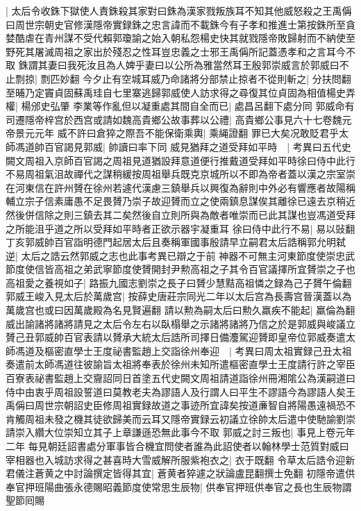 |{
	太后令收銖下獄使人責銖殺其家對曰銖為漢家戮叛族耳不知其他威怒殺之王禹偁曰周世宗朝史官修漢隱帝實録銖之忠言諱而不載銖今有子孝和推進士第按銖所至貪婪酷虐在青州謀不受代賴郭瓊諭之始入朝私怨楊史快其就戮隱帝敗歸射而不納使至野死其屠滅周祖之家出於殘忍之性耳豈忠義之士邪王禹偁所記蓋憑孝和之言耳今不取}
銖謂其妻曰我死汝且為人婢乎妻曰以公所為雅當然耳王殷郭崇威言於郭威曰不止剽掠|{
	剽匹妙翻}
今夕止有空城耳威乃命諸將分部禁止掠者不從則斬之|{
	分扶問翻}
至晡乃定竇貞固蘇禹珪自七里寨逃歸郭威使人訪求得之尋復其位貞固為相值楊史弄權|{
	楊邠史弘肇}
李業等作亂但以凝重處其間自全而已|{
	處昌呂翻下處分同}
郭威命有司遷隱帝梓宫於西宫或請如魏高貴鄉公故事葬以公禮|{
	高貴鄉公事見六十七卷魏元帝景元元年}
威不許曰倉猝之際吾不能保衛乘輿|{
	乘䋲證翻}
罪已大矣况敢貶君乎太師馮道帥百官謁見郭威|{
	帥讀曰率下同}
威見猶拜之道受拜如平時　|{
	考異曰五代史闕文周祖入京師百官謁之周祖見道猶設拜意道便行推戴道受拜如平時徐曰侍中此行不易周祖氣沮故禪代之謀稍緩按周祖舉兵既克京城所以不即為帝者蓋以漢之宗室崇在河東信在許州贇在徐州若遽代漢慮三鎮舉兵以興復為辭則中外必有響應者故陽稱輔立宗子信素庸愚不足畏贇乃崇子故迎贇而立之使兩鎮息謀俟其離徐已遠去京稍近然後併信除之則三鎮去其二矣然後自立則所與為敵者唯崇而已此其謀也豈馮道受拜之所能沮乎道之所以受拜如平時者正欲示器宇凝重耳}
徐曰侍中此行不易|{
	易以䜴翻}
丁亥郭威帥百官詣明德門起居太后且奏稱軍國事殷請早立嗣君太后誥稱郭允明弑逆|{
	太后之誥云然郭威之志也此事考異已辯之于前}
神器不可無主河東節度使崇忠武節度使信皆高祖之弟武寧節度使贇開封尹勲高祖之子其令百官議擇所宜贇崇之子也高祖愛之養視如子|{
	路振九國志劉崇之長子曰贇少慧黠高祖憐之録為己子贇午倫翻}
郭威王峻入見太后於萬歲宫|{
	按薛史唐莊宗同光二年以太后宫為長壽宫晉漢蓋以為萬歲宫也或曰因萬歲殿為名見賢遍翻}
請以勲為嗣太后曰勲久羸疾不能起|{
	羸倫為翻}
威出諭諸將諸將請見之太后令左右以臥榻舉之示諸將諸將乃信之於是郭威與峻議立贇己丑郭威帥百官表請以贇承大統太后誥所司擇日備灋駕迎贇即皇帝位郭威奏遣太師馮道及樞密直學士王度祕書監趙上交詣徐州奉迎　|{
	考異曰周太祖實録己丑太祖奏遣前太師馮道往彼諭旨太祖將奉表於徐州未知所遣樞密直學士王度請行許之宰臣百寮表祕書監趙上交齎詔同日首塗五代史闕文周祖請道詣徐州冊湘隂公為漢嗣道曰侍中由衷乎周祖設誓道曰莫教老夫為謬語人及行謂人曰平生不謬語今為謬語人矣王禹偁曰周世宗朝詔史臣修周祖實録故道之事迹所宜諱矣按道亷智自將陽愚遠禍恐不肯觸周祖未發之機其徒欲歸美而云耳又隱帝實録云初議立徐帥太后遣中使馳諭劉崇請崇入纘大位崇知立其子上章謙遜恐無此事今不取}
郭威之討三叛也|{
	事見上卷元年二年}
每見朝廷詔書處分軍事皆合機宜問使者誰為此詔使者以翰林學士范質對威曰宰相器也入城訪求得之甚喜時大雪威解所服紫袍衣之|{
	衣于既翻}
令草太后誥令迎新君儀注蒼黄之中討論撰定皆得其宜|{
	蒼黄者猝遽之狀論盧昆翻撰士免翻}
初隱帝遣供奉官押班陽曲張永德賜昭義節度使常思生辰物|{
	供奉官押班供奉官之長也生辰物謂聖節囘賜}
